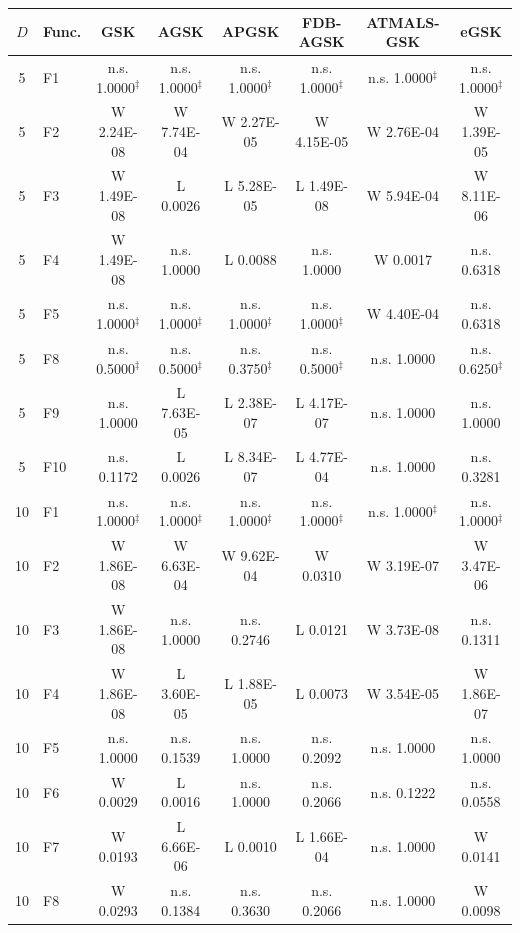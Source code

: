 \documentclass[10pt,a4paper]{article}
\begin{document}
\begin{table}[p]
\zebra
\begin{tabular}{clcccccc}
\toprule
\textbf{$D$} & \textbf{Func.} & \textbf{GSK} & \textbf{AGSK} & \textbf{APGSK} & \textbf{FDB-AGSK} & \textbf{ATMALS-GSK} & \textbf{eGSK} \\
\midrule
5 & F1 & n.s. 1.0000$^{\ddagger}$ & n.s. 1.0000$^{\ddagger}$ & n.s. 1.0000$^{\ddagger}$ & n.s. 1.0000$^{\ddagger}$ & n.s. 1.0000$^{\ddagger}$ & n.s. 1.0000$^{\ddagger}$ \\
5 & F2 & W 2.24E-08 & W 7.74E-04 & W 2.27E-05 & W 4.15E-05 & W 2.76E-04 & W 1.39E-05 \\
5 & F3 & W 1.49E-08 & L 0.0026 & L 5.28E-05 & L 1.49E-08 & W 5.94E-04 & W 8.11E-06 \\
5 & F4 & W 1.49E-08 & n.s. 1.0000 & L 0.0088 & n.s. 1.0000 & W 0.0017 & n.s. 0.6318 \\
5 & F5 & n.s. 1.0000$^{\ddagger}$ & n.s. 1.0000$^{\ddagger}$ & n.s. 1.0000$^{\ddagger}$ & n.s. 1.0000$^{\ddagger}$ & W 4.40E-04 & n.s. 0.6318 \\
5 & F8 & n.s. 0.5000$^{\ddagger}$ & n.s. 0.5000$^{\ddagger}$ & n.s. 0.3750$^{\ddagger}$ & n.s. 0.5000$^{\ddagger}$ & n.s. 1.0000 & n.s. 0.6250$^{\ddagger}$ \\
5 & F9 & n.s. 1.0000 & L 7.63E-05 & L 2.38E-07 & L 4.17E-07 & n.s. 1.0000 & n.s. 1.0000 \\
5 & F10 & n.s. 0.1172 & L 0.0026 & L 8.34E-07 & L 4.77E-04 & n.s. 1.0000 & n.s. 0.3281 \\
\midrule
10 & F1 & n.s. 1.0000$^{\ddagger}$ & n.s. 1.0000$^{\ddagger}$ & n.s. 1.0000$^{\ddagger}$ & n.s. 1.0000$^{\ddagger}$ & n.s. 1.0000$^{\ddagger}$ & n.s. 1.0000$^{\ddagger}$ \\
10 & F2 & W 1.86E-08 & W 6.63E-04 & W 9.62E-04 & W 0.0310 & W 3.19E-07 & W 3.47E-06 \\
10 & F3 & W 1.86E-08 & n.s. 1.0000 & n.s. 0.2746 & L 0.0121 & W 3.73E-08 & n.s. 0.1311 \\
10 & F4 & W 1.86E-08 & L 3.60E-05 & L 1.88E-05 & L 0.0073 & W 3.54E-05 & W 1.86E-07 \\
10 & F5 & n.s. 1.0000 & n.s. 0.1539 & n.s. 1.0000 & n.s. 0.2092 & n.s. 1.0000 & n.s. 1.0000 \\
10 & F6 & W 0.0029 & L 0.0016 & n.s. 1.0000 & n.s. 0.2066 & n.s. 0.1222 & n.s. 0.0558 \\
10 & F7 & W 0.0193 & L 6.66E-06 & L 0.0010 & L 1.66E-04 & n.s. 1.0000 & W 0.0141 \\
10 & F8 & W 0.0293 & n.s. 0.1384 & n.s. 0.3630 & n.s. 0.2066 & n.s. 1.0000 & W 0.0098 \\

\end{tabular}
\end{table}
\end{document}
